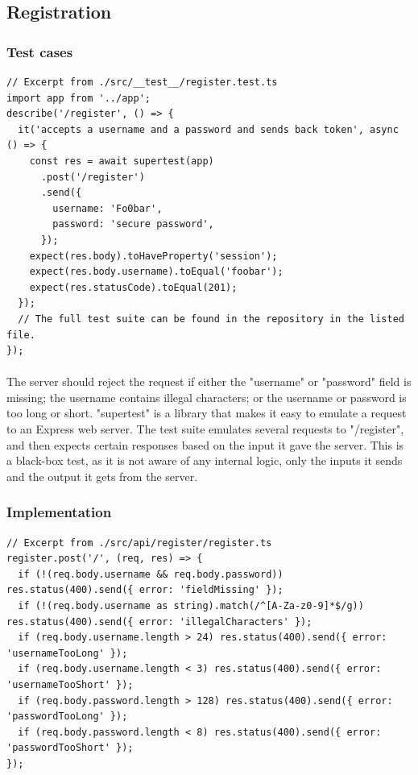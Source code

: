 \documentclass{report}
\begin{document}
\subsection{Registration}
\subsubsection{Test cases}

\begin{verbatim}
// Excerpt from ./src/__test__/register.test.ts
import app from '../app';
describe('/register', () => {
  it('accepts a username and a password and sends back token', async () => {
    const res = await supertest(app)
      .post('/register')
      .send({
        username: 'Fo0bar',
        password: 'secure password',
      });
    expect(res.body).toHaveProperty('session');
    expect(res.body.username).toEqual('foobar');
    expect(res.statusCode).toEqual(201);
  });
  // The full test suite can be found in the repository in the listed file.
});
\end{verbatim}

\paragraph{}
The server should reject the request if either the "username" or "password" field is missing; the username contains illegal characters; or the username or password is too long or short. "supertest" is a library that makes it easy to emulate a request to an Express web server. The test suite emulates several requests to "/register", and then expects certain responses based on the input it gave the server. This is a black-box test, as it is not aware of any internal logic, only the inputs it sends and the output it gets from the server.

\subsubsection{Implementation}

\begin{verbatim}
// Excerpt from ./src/api/register/register.ts
register.post('/', (req, res) => {
  if (!(req.body.username && req.body.password)) res.status(400).send({ error: 'fieldMissing' });
  if (!(req.body.username as string).match(/^[A-Za-z0-9]*$/g)) res.status(400).send({ error: 'illegalCharacters' });
  if (req.body.username.length > 24) res.status(400).send({ error: 'usernameTooLong' });
  if (req.body.username.length < 3) res.status(400).send({ error: 'usernameTooShort' });
  if (req.body.password.length > 128) res.status(400).send({ error: 'passwordTooLong' });
  if (req.body.password.length < 8) res.status(400).send({ error: 'passwordTooShort' });
});
\end{verbatim}
\end{document}
